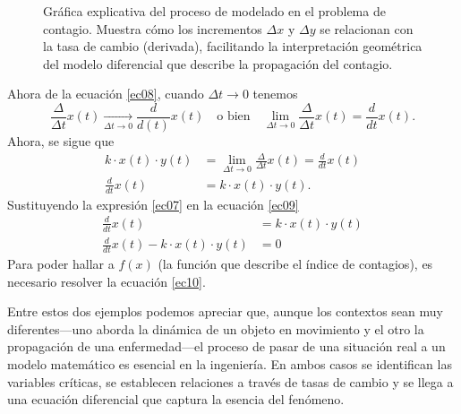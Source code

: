 \begin{example}{}{}
\begin{figure}
        \caption{Gráfica explicativa del proceso de modelado en el problema de contagio. Muestra cómo los incrementos $\Delta x$ y $\Delta y$ se relacionan con la tasa de cambio (derivada), facilitando la interpretación geométrica del modelo diferencial que describe la propagación del contagio.}
        \label{fig04}
    \end{figure}
    Ahora de la ecuación \eqref{ec08}, cuando $\Delta t \to 0$ tenemos
    $$\frac{\Delta}{\Delta t}x(t) \xrightarrow[\Delta t \to 0]{} \frac{d}{d(t)}x(t) \quad \text{o bien} \quad \lim_{\Delta t \to 0} \frac{\Delta}{\Delta t}x(t) = \frac{d}{dt}x(t).$$
    Ahora, se sigue que
    \begin{align}
        k \cdot x(t) \cdot y(t) & = \lim_{\Delta t \to 0} \frac{\Delta}{\Delta t}x(t) = \frac{d}{dt}x(t) \nonumber \\
        \frac{d}{dt}x(t) & = k \cdot x(t) \cdot y(t). \label{ec09}
    \end{align}
    Sustituyendo la expresión \eqref{ec07} en la ecuación \eqref{ec09}
    \begin{align}
        \frac{d}{dt}x(t) & = k \cdot x(t) \cdot y(t) \nonumber \\
        \frac{d}{dt}x(t) - k \cdot x(t) \cdot y(t) & = 0 \label{ec10}
    \end{align}
    Para poder hallar a $f(x)$ (la función que describe el índice de contagios), es necesario resolver la ecuación \eqref{ec10}.
\end{example}
Entre estos dos ejemplos podemos apreciar que, aunque los contextos sean muy diferentes—uno aborda la dinámica de un objeto en movimiento y el otro la propagación de una enfermedad—el proceso de pasar de una situación real a un modelo matemático es esencial en la ingeniería. En ambos casos se identifican las variables críticas, se establecen relaciones a través de tasas de cambio y se llega a una ecuación diferencial que captura la esencia del fenómeno.

